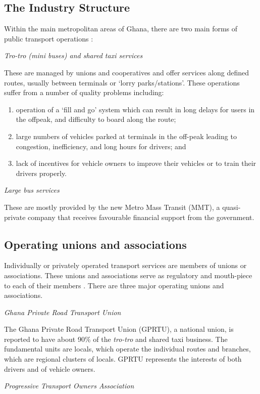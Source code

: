 \subsection{The Industry Structure}
Within the main metropolitan areas of Ghana, there are two main forms of public transport operations \citep{finn2009new}:

	\textit{Tro-tro (mini buses) and shared taxi services}
	
	These are managed by unions and cooperatives and offer services along defined routes, usually between terminals or ‘lorry parks/stations’. These operations suffer from a number of quality problems including:
	\begin{enumerate}
		\item operation of a ‘fill and go’ system which can result in long delays for users in the offpeak, and difficulty to board along the route;
		\item large numbers of vehicles parked at
		terminals in the off-peak leading to congestion, inefficiency, and long hours for
		drivers; and
		\item lack of incentives for vehicle owners to improve their vehicles or to train their drivers properly.
	\end{enumerate}

\textit{Large bus services}

These are mostly provided by the new Metro Mass Transit (MMT), a quasi-private company that receives favourable financial support from the government.


\subsection{Operating unions and associations}
Individually or privately operated transport services are members of unions or associations. These unions and associations serve as regulatory and mouth-piece to each of their members \citep{fouracre1994public}. There are three major operating unions and associations.

\textit{Ghana Private Road Transport Union}

The Ghana Private Road Transport Union (GPRTU), a national union, is reported to have about 90\% of the \textit{tro-tro} and shared taxi business. The fundamental units are locals, which operate the individual routes and branches, which are regional clusters of locals. GPRTU represents the interests of both drivers and of vehicle owners.

\textit{Progressive Transport Owners Association}

